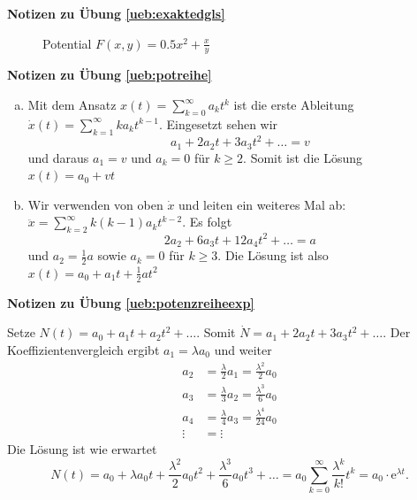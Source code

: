 \documentclass[%
11pt,%
twoside,%
titlepage,%
swissgerman,%
headsepline%
]{scrartcl}
\newcommand{\faReturnGray}{\textcolor{gray}{\faMailReply}} %
\theoremstyle{definition}
\theoremstyle{plain}
\newcommand{\concatueb}[1]{ueb:#1}%
\newcommand{\concatlsg}[1]{lsg:#1}%
\newenvironment{lsg}[1]{%
    \par\noindent\textbf{Notizen zu Übung \ref{\concatueb{#1}}}\label{\concatlsg{#1}}
    \hfill\hyperref[\concatueb{#1}]{\faReturnGray}\par %
}{%
    \par%
}
\begin{document}
\begin{lsg}{exaktedgls}
\begin{enumerate}[a)]
        \begin{figure}[h!]
    \centering
    \caption{Potential $F(x,y)=0.5x^2+\frac{x}{y}$}
\end{figure}
    \end{enumerate}
\end{lsg}
\begin{lsg}{potreihe}
    \begin{enumerate}[a)]
        \item Mit dem Ansatz $x(t)=\sum_{k=0}^\infty a_kt^k$ ist die erste Ableitung $\dot{x}(t)=\sum_{k=1}^\infty ka_kt^{k-1}$. Eingesetzt sehen wir
        $$a_1+2a_2t+3a_3t^2+\dots = v$$
        und daraus $a_1=v$ und $a_k=0$ für $k\geq2$. Somit ist die Lösung $x(t)=a_0+vt$
        \item Wir verwenden von oben $\dot{x}$ und leiten ein weiteres Mal ab: $\ddot{x}=\sum_{k=2}^\infty k(k-1)a_kt^{k-2}$. Es folgt
        $$2a_2+6a_3t+12a_4t^2+\dots = a$$
        und $a_2=\frac{1}{2}a$ sowie $a_k=0$ für $k\geq3$. Die Lösung ist also $x(t)=a_0+a_1t+\frac{1}{2}at^2$
        
    \end{enumerate}
\end{lsg}
\begin{lsg}{potenzreiheexp}
    Setze $N(t)=a_0+a_1t+a_2t^2+\dots$. Somit $\dot{N}=a_1+2a_2t+3a_3t^2+\dots$. Der Koeffizientenvergleich ergibt $a_1=\lambda a_0$ und weiter
    \begin{align*}
        a_2 &= \frac{\lambda}{2}a_1=\frac{\lambda^2}{2}a_0\\
        a_3 &= \frac{\lambda}{3}a_2=\frac{\lambda^3}{6}a_0\\
        a_4 &= \frac{\lambda}{4}a_3=\frac{\lambda^4}{24}a_0\\
        \vdots &= \vdots
    \end{align*}
    Die Lösung ist wie erwartet
    $$N(t)=a_0+\lambda a_0t+\frac{\lambda^2}{2}a_0t^2+\frac{\lambda^3}{6}a_0t^3+\dots = a_0\sum_{k=0}^\infty \frac{\lambda ^k}{k!}t^k=a_0\cdot\mathrm{e}^{\lambda t}.$$
\end{lsg}
\end{document}
